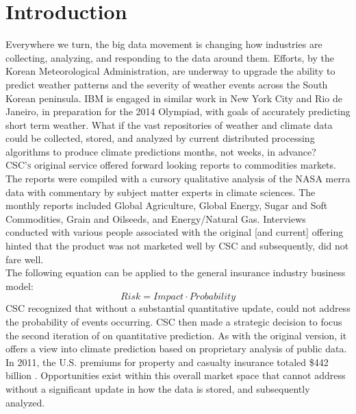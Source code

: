 
\section{Introduction}
Everywhere we turn, the big data movement is changing how industries are collecting, analyzing, and responding to the data around them. Efforts, by the Korean Meteorological Administration, are underway to upgrade the ability to predict weather patterns and the severity of weather events across the South Korean peninsula. IBM is engaged in similar work in New York City and Rio de Janeiro, in preparation for the 2014 Olympiad, with goals of accurately predicting short term weather\cite{rwe}. What if the vast repositories of weather and climate data could be collected, stored, and analyzed by current distributed processing algorithms to produce climate predictions months, not weeks, in advance?\\

\textsc{CSC's} original \climatedge  service offered forward looking reports  to commodities markets. The reports were compiled with a cursory qualitative analysis of the NASA \gls{merra}  data with commentary by subject matter experts in climate sciences. The monthly reports included Global Agriculture, Global Energy, Sugar and Soft Commodities, Grain and Oilseeds, and Energy/Natural Gas\cite{climatedgeurl}. Interviews conducted with various people associated with the original [and current] \climatedge offering hinted that the product was not marketed well by \textsc{CSC} and subsequently, did not fare well.\\

The following equation can be applied to the general insurance industry business model: 
\begin{equation*}
    Risk = Impact \cdot Probability
\end{equation*}
\textsc{CSC} recognized that without a substantial quantitative update, \climatedge could not address the probability of events occurring. \textsc{CSC} then made a strategic decision to focus the second iteration of \climatedge on quantitative prediction. As with the original version, it offers a view into climate prediction based on proprietary analysis of public data. In 2011, the U.S. premiums for property and casualty insurance totaled \$442 billion \cite{iii}. Opportunities exist within this overall market space that \climatedge cannot address without a significant update in how the data is stored, and subsequently analyzed.
